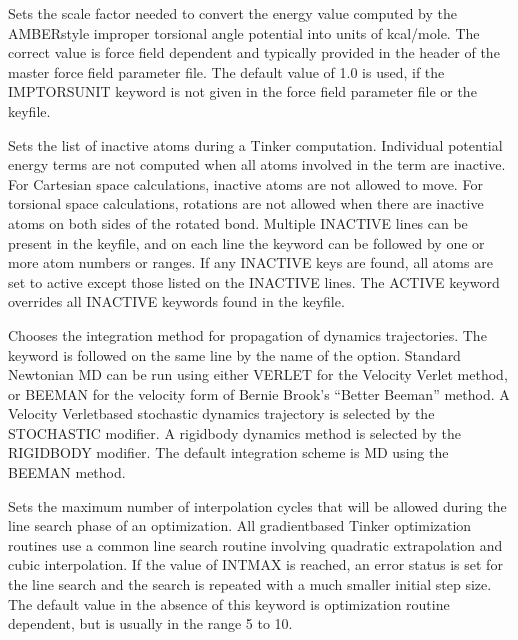\documentclass[letterpaper,11pt,english]{sphinxmanual}
\begin{document}
  Sets the scale factor needed to convert the energy value computed by the AMBER\sphinxhyphen{}style improper torsional angle potential into units of kcal/mole. The correct value is force field dependent and typically provided in the header of the master force field parameter file. The default value of 1.0 is used, if the IMPTORSUNIT keyword is not given in the force field parameter file or the keyfile.

  Sets the list of inactive atoms during a Tinker computation. Individual potential energy terms are not computed when all atoms involved in the term are inactive. For Cartesian space calculations, inactive atoms are not allowed to move. For torsional space calculations, rotations are not allowed when there are inactive atoms on both sides of the rotated bond. Multiple INACTIVE lines can be present in the keyfile, and on each line the keyword can be followed by one or more atom numbers or ranges. If any INACTIVE keys are found, all atoms are set to active except those listed on the INACTIVE lines. The ACTIVE keyword overrides all INACTIVE keywords found in the keyfile.





  Chooses the integration method for propagation of dynamics trajectories. The keyword is followed on the same line by the name of the option. Standard Newtonian MD can be run using either VERLET for the Velocity Verlet method, or BEEMAN for the velocity form of Bernie Brook’s “Better Beeman” method. A Velocity Verlet\sphinxhyphen{}based stochastic dynamics trajectory is selected by the STOCHASTIC modifier. A rigid\sphinxhyphen{}body dynamics method is selected by the RIGIDBODY modifier. The default integration scheme is MD using the BEEMAN method.

  Sets the maximum number of interpolation cycles that will be allowed during the line search phase of an optimization. All gradient\sphinxhyphen{}based Tinker optimization routines use a common line search routine involving quadratic extrapolation and cubic interpolation. If the value of INTMAX is reached, an error status is set for the line search and the search is repeated with a much smaller initial step size. The default value in the absence of this keyword is optimization routine dependent, but is usually in the range 5 to 10.
\end{document}
